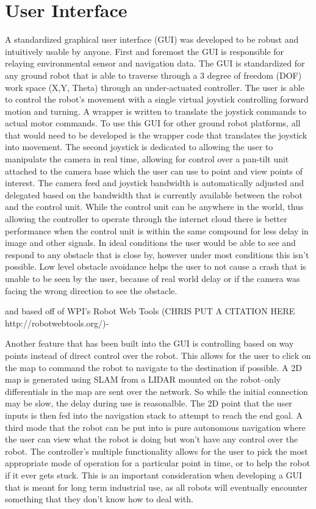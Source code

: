 \section{User Interface}\label{sec:ui}

A standardized graphical user interface (GUI) was developed to be robust and intuitively usable by anyone. First and foremost the GUI is responsible for relaying environmental sensor and navigation data. The GUI is standardized for any ground robot that is able to traverse through a 3 degree of freedom (DOF) work space (X,Y, Theta) through an under-actuated controller. The user is able to control the robot's movement with a single virtual joystick controlling forward motion and turning. A wrapper is written to translate the joystick commands to actual motor commands. To use this GUI for other ground robot platforms, all that would need to be developed is the wrapper code that translates the joystick into movement. The second joystick is dedicated to allowing the user to manipulate the camera in real time, allowing for control over a pan-tilt unit attached to the camera base which the user can use to point and view points of interest. The camera feed and joystick bandwidth is automatically adjusted and delegated based on the bandwidth that is currently  available between the robot and the control unit. While the control unit can be anywhere in the world, thus allowing the controller to operate through the internet cloud there is better performance when the control unit is within the same compound for less delay in image and other signals. In ideal conditions the user would be able to see and respond to any obstacle that is close by, however under most conditions this isn't possible. Low level obstacle avoidance helps the user to not cause a crash that is unable to be seen by the user, because of real world delay or if the camera was facing the wrong direction to see the obstacle.

and based off of WPI's Robot Web Tools (CHRIS PUT A CITATION HERE http://robotwebtools.org/)-

Another feature that has been built into the GUI is controlling based on way points instead of direct control over the robot. This allows for the user to click on the map to command the robot to navigate to the destination if possible. A 2D map is generated using SLAM from a LIDAR mounted on the robot--only differentials in the map are sent over the network. So while the initial connection may be slow, the delay during use is reasonalble. The 2D point that the user inputs is then fed into the navigation stack to attempt to reach the end goal. A third mode that the robot can be put into is pure autonomous navigation where the user can view what the robot is doing but won't have any control over the robot. The controller's multiple functionality allows for the user to pick the most appropriate mode of operation for a particular point in time, or to help the robot if it ever gets stuck. This is an important consideration when developing a GUI that is meant for long term industrial use, as all robots will eventually encounter something that they don't know how to deal with. 


